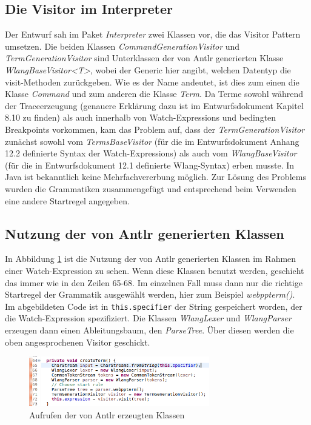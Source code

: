 \documentclass[parskip=full]{scrartcl}
\begin{document}
\subsection{Die Visitor im Interpreter} Der Entwurf sah im Paket \textit{Interpreter} zwei Klassen vor, die das Visitor Pattern umsetzen. Die beiden Klassen \textit{CommandGenerationVisitor} und \textit{TermGenerationVisitor} sind Unterklassen der von Antlr generierten Klasse \textit{WlangBaseVisitor<T>}, wobei der Generic hier angibt, welchen Datentyp die visit-Methoden zurückgeben. Wie es der Name andeutet, ist dies zum einen die Klasse \textit{Command} und zum anderen die Klasse \textit{Term}. 
Da Terme sowohl während der Traceerzeugung (genauere Erklärung dazu ist im Entwurfsdokument Kapitel 8.10 zu finden) als auch innerhalb von Watch-Expressions und bedingten Breakpoints vorkommen, kam das Problem auf, dass der \textit{TermGenerationVisitor} zunächst sowohl vom \textit{TermsBaseVisitor} (für die im Entwurfsdokument Anhang 12.2 definierte Syntax der Watch-Expressions) als auch vom \textit{WlangBaseVisitor} (für die in Entwurfsdokument 12.1 definierte Wlang-Syntax) erben musste. In Java ist bekanntlich keine Mehrfachvererbung möglich. Zur Lösung des Problems wurden die Grammatiken zusammengefügt und entsprechend beim Verwenden eine andere Startregel angegeben. 
\subsection{Nutzung der von Antlr generierten Klassen}
In Abbildung \ref{createTerm} ist die Nutzung der von Antlr generierten Klassen im Rahmen einer Watch-Expression zu sehen. Wenn diese Klassen benutzt werden, geschieht das immer wie in den Zeilen 65-68. Im einzelnen Fall muss dann nur die richtige Startregel der Grammatik ausgewählt werden, hier zum Beispiel \textit{webppterm()}. \\
Im abgebildeten Code ist in \texttt{this.specifier} der String gespeichert worden, der die Watch-Expression spezifiziert. Die Klassen \textit{WlangLexer} und \textit{WlangParser} erzeugen dann einen Ableitungsbaum, den \textit{ParseTree}. Über diesen werden die oben angesprochenen Visitor geschickt.
\begin{figure}[!h]
\includegraphics[width=0.7\textwidth]{document_data/createTerm.png}
\caption{Aufrufen der von Antlr erzeugten Klassen}
\label{createTerm}
\end{figure}
\end{document}
